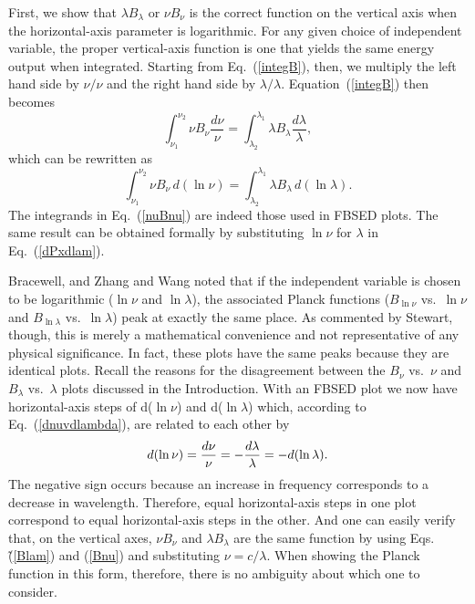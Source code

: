 \documentclass[12pt,aps,prb,preprint]{revtex4}   %
\begin{document}
First, we show that $\lambda B_\lambda$ or $\nu B_\nu$ is the correct function on the vertical axis when the horizontal-axis parameter is logarithmic.  For any given choice of independent variable, the proper vertical-axis function is one that yields the same energy output when integrated.  Starting from Eq.~(\ref{integB}), then, we multiply the left hand side by $\nu / \nu$ and the right hand side by 
$\lambda / \lambda$.  Equation~(\ref{integB}) then becomes
\begin{equation}
\int_{\nu_1}^{\nu_2}{\nu B_\nu \frac{d\nu}{\nu}}=\int_{\lambda_2}^{\lambda_1}{\lambda B_\lambda \frac{d\lambda}{\lambda}},
\end{equation}
which can be rewritten as
\begin{equation}
\int_{\nu_1}^{\nu_2}{\nu B_\nu\, d(\ln\nu)}=\int_{\lambda_2}^{\lambda_1}{\lambda B_\lambda\, d(\ln\lambda)}.
\label{nuBnu}
\end{equation}
The integrands in Eq.~(\ref{nuBnu}) are indeed those used in FBSED plots.  The same result can be obtained formally by substituting $\ln\nu$ for $\lambda$ in Eq.~(\ref{dPxdlam}).

Bracewell,\cite{Bracewell} and Zhang and Wang\cite{ZW} noted that if the independent variable is chosen to be logarithmic ($\ln\nu$ and $\ln\lambda$), the associated Planck functions 
($B_{\ln\nu}$ vs.\ $\ln\nu$ and $B_{\ln\lambda}$ vs.\ $\ln\lambda$) peak at exactly the same place.  As commented by Stewart, though, this is merely a mathematical convenience and not representative of any physical significance.\cite{Stewart}  In fact, these plots have the same peaks because they are identical plots.  Recall the reasons for the disagreement between the 
$B_\nu$ vs.\ $\nu$ and $B_\lambda$ vs.\ $\lambda$ plots discussed in the Introduction.  With an FBSED plot we now have horizontal-axis steps of d($\ln\nu$) and d($\ln\lambda$) which, according to Eq.~(\ref{dnuvdlambda}), are related to each other by
\begin{equation}
d(\ln\nu) = {d\nu \over \nu} = -{d\lambda \over \lambda} = -d(\ln\lambda).
\end{equation}
The negative sign occurs because an increase in frequency corresponds to a decrease in wavelength.  Therefore, equal horizontal-axis steps in one plot correspond to equal horizontal-axis steps in the other.  And one can easily verify that, on the vertical axes, $\nu B_\nu$ and $\lambda B_\lambda$ are the same function by using Eqs.\~(\ref{Blam}) and (\ref{Bnu}) and substituting $\nu = c / \lambda$.  When showing the Planck function in this form, therefore, there is no ambiguity about which one to consider.
\end{document}
